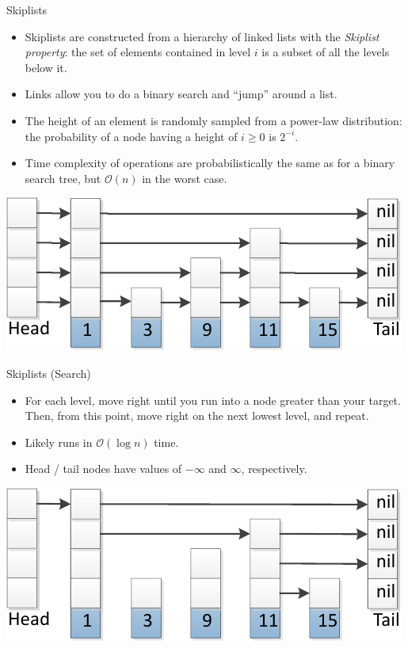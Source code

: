 \documentclass{beamer}
\begin{document}
\begin{frame}{Skiplists}
  \begin{itemize}
    \item Skiplists are constructed from a hierarchy of linked lists with the \textit{Skiplist property}:
      the set of elements contained in level $i$ is a subset of all the levels below it.
    \item Links allow you to do a binary search and ``jump'' around a list.
    \item The height of an element is randomly sampled from a power-law distribution: the probability of
      a node having a height of $i \geq 0$ is $2^{-i}$.
    \item Time complexity of operations are probabilistically the same as for a binary search tree, but
      $\mathcal{O}(n)$ in the worst case.
  \end{itemize}
  \begin{center}
    \includegraphics[scale=0.75]{img/skiplist-crop.pdf}
  \end{center}
\end{frame}

\begin{frame}{Skiplists (Search)}
  \begin{itemize}
    \item For each level, move right until you run into a node greater than your target. Then, from
      this point, move right on the next lowest level, and repeat.
    \item Likely runs in $\mathcal{O}(\log n)$ time.
    \item Head / tail nodes have values of $-\infty$ and $\infty$, respectively.
  \end{itemize}
  \begin{center}
    \includegraphics[scale=0.75]{img/skiplistSearch15-crop.pdf}
  \end{center}
\end{frame}
\end{document}
